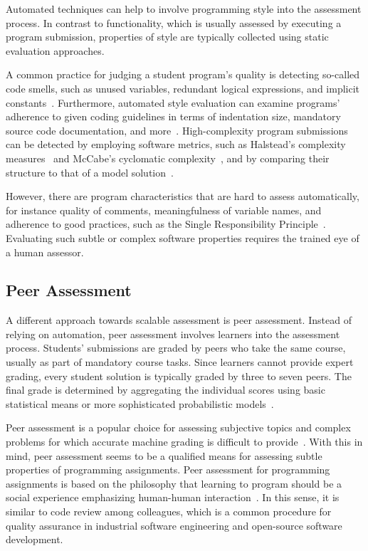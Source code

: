 Automated techniques can help to involve programming style into the assessment process. In contrast to functionality, which is usually assessed by executing a program submission, properties of style are typically collected using static evaluation approaches.

A common practice for judging a student program's quality is detecting so-called code smells, such as unused variables, redundant logical expressions, and implicit constants~\cite{truong2005learning}. Furthermore, automated style evaluation can examine programs' adherence to given coding guidelines in terms of indentation size, mandatory source code documentation, and more~\cite{ala2004supporting}. High-complexity program submissions can be detected by employing software metrics, such as Halstead's complexity measures~\cite{halstead1977elements} and McCabe's cyclomatic complexity~\cite{mccabe1976complexity}, and by comparing their structure to that of a model solution~\cite{truong2005learning}.

However, there are program characteristics that are hard to assess automatically, for instance quality of comments, meaningfulness of variable names, and adherence to good practices, such as the Single Responsibility Principle~\cite{martin2003agile}. Evaluating such subtle or complex software properties requires the trained eye of a human assessor.

\subsection{Peer Assessment}

A different approach towards scalable assessment is peer assessment. Instead of relying on automation, peer assessment involves learners into the assessment process. Students' submissions are graded by peers who take the same course, usually as part of mandatory course tasks. Since learners cannot provide expert grading, every student solution is typically graded by three to seven peers. The final grade is determined by aggregating the individual scores using basic statistical means or more sophisticated probabilistic models~\cite{piech2013tuned}.

Peer assessment is a popular choice for assessing subjective topics and complex problems for which accurate machine grading is difficult to provide~\cite{shah2014some}. With this in mind, peer assessment seems to be a qualified means for assessing subtle properties of programming assignments. Peer assessment for programming assignments is based on the philosophy that learning to program should be a social experience emphasizing human-human interaction~\cite{lahtinen2005study}. In this sense, it is similar to code review among colleagues, which is a common procedure for quality assurance in industrial software engineering and open-source software development.

